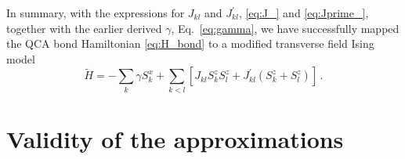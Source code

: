 In summary, with the expressions for $J_{kl}$ and $J^{\prime}_{kl}$,
\eqref{eq:J_} and \eqref{eq:Jprime_}, together with the earlier derived
$\gamma$, Eq.~\eqref{eq:gamma}, we have successfully mapped the QCA bond
Hamiltonian \eqref{eq:H_bond} to a modified transverse field Ising model
\begin{equation}
  \label{eq:H_Ising}
  \tilde{H}
  =
  - \sum_k \gamma S^x_k
  + \sum_{k<l}
    \left[
      J_{kl} S^z_k S^z_l + 
      J^{\prime}_{kl} \left( S^z_k + S^z_l \right)
    \right] \, .
\end{equation}


\section{Validity of the approximations}



